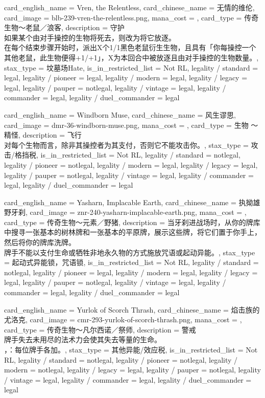\documentclass[lang = cn, color = black, 10pt]{AllThatStax}
\begin{document}
\card
{
	card_english_name = {Vren, the Relentless},
	card_chinese_name = {无情的维伦},
	card_image = blb-239-vren-the-relentless.png,
	mana_cost = ,
	card_type = 传奇生物～老鼠／浪客,
	description = {守护\\
如果某个由对手操控的生物将死去，则改为将它放逐。\\
在每个结束步骤开始时，派出X个1/1黑色老鼠衍生生物，且具有「你每操控一个其他老鼠，此生物便得+1/+1」，X为本回合中被放逐且由对手操控的生物数量。},
	stax_type = 坟墓场Hate,
	is_in_restricted_list = Not RL,
	legality / standard = legal,
	legality / pioneer = legal,
	legality / modern = legal,
	legality / legacy = legal,
	legality / pauper = notlegal,
	legality / vintage = legal,
	legality / commander = legal,
	legality / duel_commander = legal
}

\card
{
	card_english_name = {Windborn Muse},
	card_chinese_name = {风生谬思},
	card_image = dmr-36-windborn-muse.png,
	mana_cost = ,
	card_type = 生物 ～精怪,
	description = {飞行\\
对每个生物而言，除非其操控者为其支付，否则它不能攻击你。},
	stax_type = 攻击/格挡税,
	is_in_restricted_list = Not RL,
	legality / standard = notlegal,
	legality / pioneer = notlegal,
	legality / modern = legal,
	legality / legacy = legal,
	legality / pauper = notlegal,
	legality / vintage = legal,
	legality / commander = legal,
	legality / duel_commander = legal
}

\card
{
	card_english_name = {Yasharn, Implacable Earth},
	card_chinese_name = {执拗雄野牙刹},
	card_image = znr-240-yasharn-implacable-earth.png,
	mana_cost = ,
	card_type = 传奇生物～元素／野猪,
	description = {当牙刹进战场时，从你的牌库中搜寻一张基本的树林牌和一张基本的平原牌，展示这些牌，将它们置于你手上，然后将你的牌库洗牌。\\
牌手不能以支付生命或牺牲非地永久物的方式施放咒语或起动异能。},
	stax_type = 起动式异能锁，咒语锁,
	is_in_restricted_list = Not RL,
	legality / standard = notlegal,
	legality / pioneer = legal,
	legality / modern = legal,
	legality / legacy = legal,
	legality / pauper = notlegal,
	legality / vintage = legal,
	legality / commander = legal,
	legality / duel_commander = legal
}

\card
{
	card_english_name = {Yurlok of Scorch Thrash},
	card_chinese_name = {焰击族的尤洛克},
	card_image = cmr-293-yurlok-of-scorch-thrash.png,
	mana_cost = ,
	card_type = 传奇生物～凡尔西诺／祭师,
	description = {警戒\\
牌手失去未用尽的法术力会使其失去等量的生命。\\
，：每位牌手各加。},
	stax_type = 其他异能/效应税,
	is_in_restricted_list = Not RL,
	legality / standard = notlegal,
	legality / pioneer = notlegal,
	legality / modern = notlegal,
	legality / legacy = legal,
	legality / pauper = notlegal,
	legality / vintage = legal,
	legality / commander = legal,
	legality / duel_commander = legal
}
\end{document}
